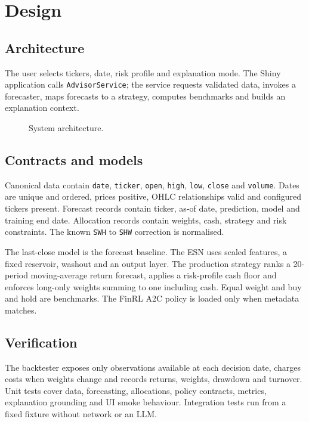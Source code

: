 \chapter{Design}
\section{Architecture}
The user selects tickers, date, risk profile and explanation mode. The Shiny application calls \texttt{AdvisorService}; the service requests validated data, invokes a forecaster, maps forecasts to a strategy, computes benchmarks and builds an explanation context.

\begin{figure}[H]\centering{}\caption{System architecture.}\label{fig:architecture}\end{figure}

\section{Contracts and models}
Canonical data contain \texttt{date}, \texttt{ticker}, \texttt{open}, \texttt{high}, \texttt{low}, \texttt{close} and \texttt{volume}. Dates are unique and ordered, prices positive, OHLC relationships valid and configured tickers present. Forecast records contain ticker, as-of date, prediction, model and training end date. Allocation records contain weights, cash, strategy and risk constraints. The known \texttt{SWH} to \texttt{SHW} correction is normalised.

The last-close model is the forecast baseline. The ESN uses scaled features, a fixed reservoir, washout and an output layer. The production strategy ranks a 20-period moving-average return forecast, applies a risk-profile cash floor and enforces long-only weights summing to one including cash. Equal weight and buy and hold are benchmarks. The FinRL A2C policy is loaded only when metadata matches.

\section{Verification}
The backtester exposes only observations available at each decision date, charges costs when weights change and records returns, weights, drawdown and turnover. Unit tests cover data, forecasting, allocations, policy contracts, metrics, explanation grounding and UI smoke behaviour. Integration tests run from a fixed fixture without network or an LLM.
